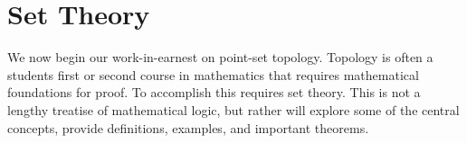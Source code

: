 \chapter{Set Theory}
    We now begin our work-in-earnest on point-set topology. Topology is often
    a students first or second course in mathematics that requires mathematical
    foundations for proof. To accomplish this requires set theory. This is not
    a lengthy treatise of mathematical logic, but rather will explore some of
    the central concepts, provide definitions, examples, and important theorems.
